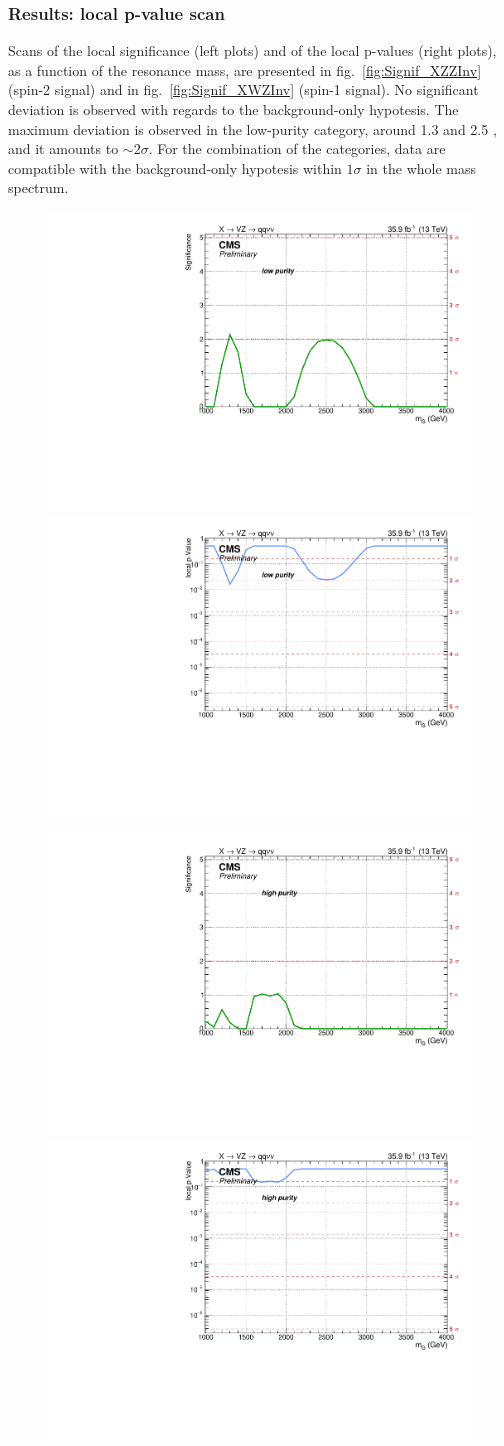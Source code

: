 \subsubsection{Results: local p-value scan}
Scans of the local significance (left plots) and of the local p-values (right plots), as a function of the resonance mass, are presented in fig.~\ref{fig:Signif_XZZInv} (spin-2 signal) and in fig.~\ref{fig:Signif_XWZInv} (spin-1 signal). No significant deviation is observed with regards to the background-only hypotesis. The maximum deviation is observed in the low-purity category, around 1.3 and 2.5 \TeV, and it amounts to $\sim 2 \sigma$. For the combination of the categories, data are compatible with the background-only hypotesis within $1 \sigma$ in the whole mass spectrum.

\begin{figure}[!htb]
  \begin{center}
     \includegraphics[width=.495\textwidth]{v9/plotsAlpha/Limits/Significance_XZZInv_XVZnnlp.pdf}%
     \includegraphics[width=.495\textwidth]{v9/plotsAlpha/Limits/pValue_XZZInv_XVZnnlp.pdf}

     \includegraphics[width=.495\textwidth]{v9/plotsAlpha/Limits/Significance_XZZInv_XVZnnhp.pdf}%
     \includegraphics[width=.495\textwidth]{v9/plotsAlpha/Limits/pValue_XZZInv_XVZnnhp.pdf}


\end{center}
\end{figure}
